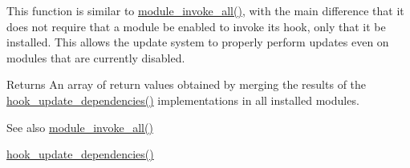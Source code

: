 This function is similar to \hyperlink{group__hooks_gabedb5f566ef5faaa5768dd15125b111c}{module\_\-invoke\_\-all()}, with the main difference that it does not require that a module be enabled to invoke its hook, only that it be installed. This allows the update system to properly perform updates even on modules that are currently disabled.

\begin{DoxyReturn}{Returns}
An array of return values obtained by merging the results of the \hyperlink{group__hooks_ga23e9e019b7ec64d95bafbeaffd295483}{hook\_\-update\_\-dependencies()} implementations in all installed modules.
\end{DoxyReturn}
\begin{DoxySeeAlso}{See also}
\hyperlink{group__hooks_gabedb5f566ef5faaa5768dd15125b111c}{module\_\-invoke\_\-all()} 

\hyperlink{group__hooks_ga23e9e019b7ec64d95bafbeaffd295483}{hook\_\-update\_\-dependencies()} 
\end{DoxySeeAlso}
